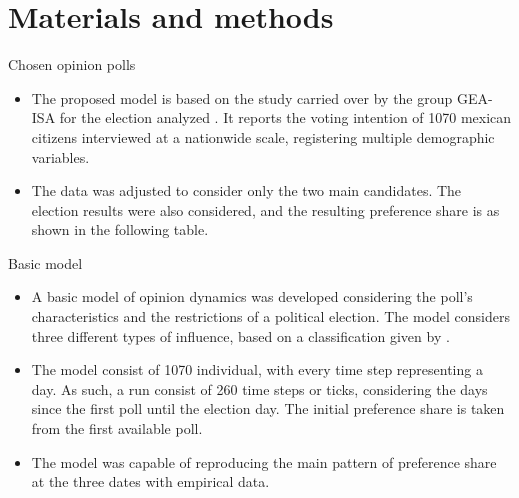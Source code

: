 \documentclass{beamer}
\begin{document}
\section{Materials and methods}
\begin{frame}{Chosen opinion polls}
	\begin{itemize}
		\item The proposed model is based on the study carried over by the group GEA-ISA for the election analyzed \cite{gea2024estudios}. It reports the voting intention of 1070 mexican citizens interviewed at a nationwide scale, registering multiple demographic variables. 
		
		\item The data was adjusted to consider only the two main candidates. The election results were also considered, and the resulting preference share is as shown in the following table.
	\end{itemize}
	\centering
	\begin{table}
	\end{table}
\end{frame}

\begin{frame}{Basic model}
	\begin{itemize}
		\item A basic model of opinion dynamics was developed considering the poll's characteristics and the restrictions of a political election. The model considers three different types of influence, based on a classification given by \cite{flacheModelsSocialInfluence2017b, smaldinoModelingSocialBehavior2023}.
		
		\item The model consist of 1070 individual, with every time step representing a day. As such, a run consist of 260 time steps or ticks, considering the days since the first poll until the election day. The initial preference share is taken from the first available poll.
		
		\item The model was capable of reproducing the main pattern of preference share at the three dates with empirical data.
	\end{itemize}	
\end{frame}
\end{document}

